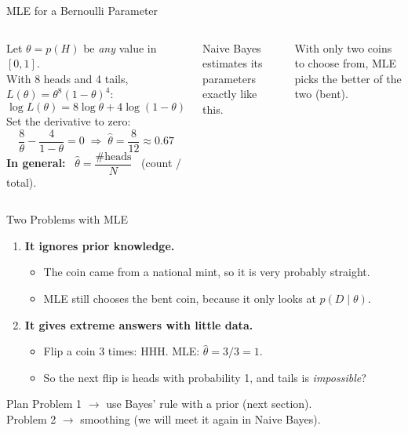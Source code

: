 \documentclass[aspectratio=169]{beamer}
\begin{document}
\begin{frame}{MLE for a Bernoulli Parameter}
\begin{columns}[c]
Let $\theta = p(H)$ be \emph{any} value in $[0,1]$.\\
With 8 heads and 4 tails, $L(\theta) = \theta^{8}(1-\theta)^{4}$:
\[
  \log L(\theta) = 8\log\theta + 4\log(1-\theta)
\]
Set the derivative to zero:
\[
  \frac{8}{\theta} - \frac{4}{1-\theta} = 0
  \;\Rightarrow\;
  \hat\theta = \frac{8}{12} \approx 0.67
\]
\textbf{In general:} \ $\hat\theta = \dfrac{\#\text{heads}}{N}$ \ (count / total).

\vspace{0.2cm}
Naive Bayes estimates its parameters exactly like this.
\centering
{}

\small With only two coins to choose from, MLE picks the better of the two (bent).
\end{columns}
\end{frame}

\begin{frame}{Two Problems with MLE}
\begin{enumerate}
  \item \textbf{It ignores prior knowledge.}
  \begin{itemize}
    \item The coin came from a national mint, so it is very probably straight.
    \item MLE still chooses the bent coin, because it only looks at $p(D\mid\theta)$.
  \end{itemize}
  \vspace{0.2cm}
  \item \textbf{It gives extreme answers with little data.}
  \begin{itemize}
    \item Flip a coin 3 times: HHH. \quad MLE: $\hat\theta = 3/3 = 1$.
    \item So the next flip is heads with probability 1, and tails is \emph{impossible}?
  \end{itemize}
\end{enumerate}
\vspace{0.3cm}
\begin{block}{Plan}
Problem 1 $\to$ use Bayes' rule with a prior (next section).\\
Problem 2 $\to$ smoothing (we will meet it again in Naive Bayes).
\end{block}
\end{frame}
\end{document}
